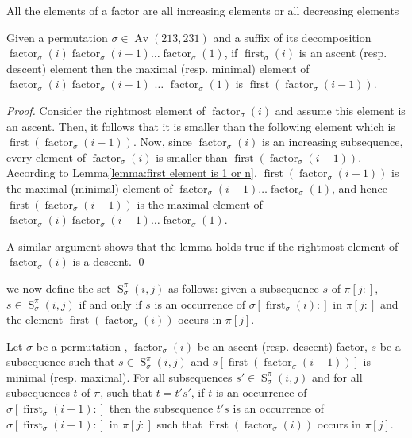 \documentclass[a4paper]{llncs}
\DeclareMathOperator{\AV}{Av}
\newcommand{\ptext}{\pi}
\newcommand{\pmotif}{\sigma}
\DeclareMathOperator{\firstia}{first}
\newcommand{\firsti}[2]{\firstia_{{#1}}({#2})}
\DeclareMathOperator{\factora}{factor}
\newcommand{\factor}[2]{\factora_{{#1}}({#2})}
\DeclareMathOperator{\firsta}{first}
\newcommand{\first}[2]{\firsta(\factor{#1}{#2})}
\DeclareMathOperator{\SETa}{S}
\newcommand{\SET}[4]{\SETa_{{#1}}^{{#2}}({#3},{#4})}
\begin{document}
\begin{remark}
All the elements of a factor are all increasing elements or all decreasing elements
\end{remark}

\begin{lemma}
\label{lemma:whereIsMax}
Given a permutation $\sigma \in \AV(213,231)$ and a suffix of its 
decomposition $\factor{\sigma}{i}\factor{\sigma}{i-1}\ldots$$\factor{\sigma}{1}$, 
if $\firsti{\sigma}{i}$ is an ascent (resp. descent) element then the maximal 
(resp. minimal) element of $\factor{\sigma}{i}\factor{\sigma}{i-1}$ $\ldots$ $\factor{\sigma}{1}$ is 
$\first{\sigma}{i-1}$.
\end{lemma}

\begin{proof}
Consider the rightmost element of $\factor{\sigma}{i}$ and assume this element is an ascent.
Then, it follows that it is smaller than the following element which is $\first{\sigma}{i-1}$.
Now, since $\factor{\sigma}{i}$ is an increasing subsequence, every element of
$\factor{\sigma}{i}$ is smaller than $\first{\sigma}{i-1}$.
According to Lemma\ref{lemma:first element is 1 or n}, $\first{\sigma}{i-1}$ is the maximal (minimal) element of $\factor{\sigma}{i-1}\ldots\factor{\sigma}{1}$, and hence
$\first{\sigma}{i-1}$ is the maximal  element of
$\factor{\sigma}{i}\factor{\sigma}{i-1}\ldots\factor{\sigma}{1}$.

A similar argument shows that the lemma holds true if the rightmost element
of $\factor{\sigma}{i}$ is a descent.
\qed
\end{proof}

we now define the set
$\SET{\pmotif}{\ptext}{i}{j}$ as follows:
given a subsequence $s$ of $\ptext[j:]$,
$s \in \SET{\pmotif}{\ptext}{i}{j}$ if and only if
$s$ is an occurrence of $\pmotif[\firsti{\pmotif}{i}:]$ in $\ptext[j:]$
and the element $\first{\pmotif}{i}$ occurs in $\ptext[j]$.

\begin{lemma}
Let $\pmotif$ be a permutation , 
$\factor{\pmotif}{i}$ be an ascent (resp. descent) factor,
$s$ be a subsequence such that $s \in \SET{\pmotif}{\ptext}{i}{j}$ and $s[\first{\pmotif}{i-1}]$ is minimal (resp. maximal). 
For all subsequences 
$s' \in \SET{\pmotif}{\ptext}{i}{j}$ and for all subsequences $t$ of $\ptext$, such that $t=t's'$, if $t$ is an occurrence of $\pmotif[\firsti{\pmotif}{i+1}:]$ then the subsequence $t's$ is an occurrence of $\pmotif[\firsti{\pmotif}{i+1}:]$ in $\ptext[j:]$ such that $\first{\pmotif}{i}$ occurs in $\ptext[j]$.
\end{lemma}
\end{document}
